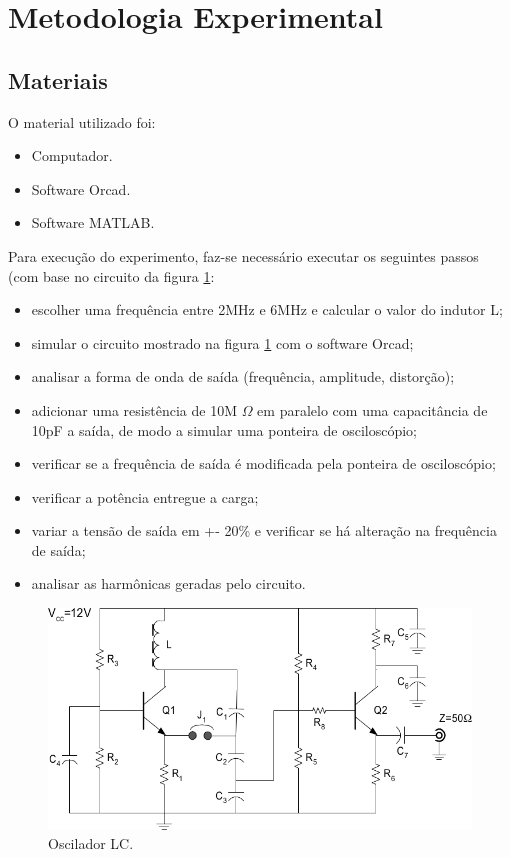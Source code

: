 \newpage
\section{Metodologia Experimental}

\subsection{Materiais}
O material utilizado foi:
\begin{itemize}
\item Computador.
\item Software Orcad.
\item Software MATLAB.

\end{itemize}
Para execução do experimento, faz-se necessário executar os seguintes passos (com base no circuito da figura \ref{f_sch}:

\begin{itemize}
\item escolher uma frequência entre 2MHz e 6MHz e calcular o valor do indutor L;
\item simular o circuito mostrado na figura \ref{f_sch} com o software Orcad;
\item analisar a forma de onda de saída (frequência, amplitude, distorção);
\item adicionar uma resistência de 10M $\Omega$ em paralelo com uma capacitância de 10pF a saída, de modo a simular uma ponteira de osciloscópio;
\item verificar se a frequência de saída é modificada pela ponteira de osciloscópio;
\item verificar a potência entregue a carga;
\item variar a tensão de saída em +- 20\% e verificar se há alteração na frequência de saída;
\item analisar as harmônicas geradas pelo circuito.
\end{itemize}

\begin{figure}[H]
\centering
\includegraphics[scale=0.3]{Imagens/sch.png}
\caption{Oscilador LC.}
\label{f_sch}
\end{figure}
